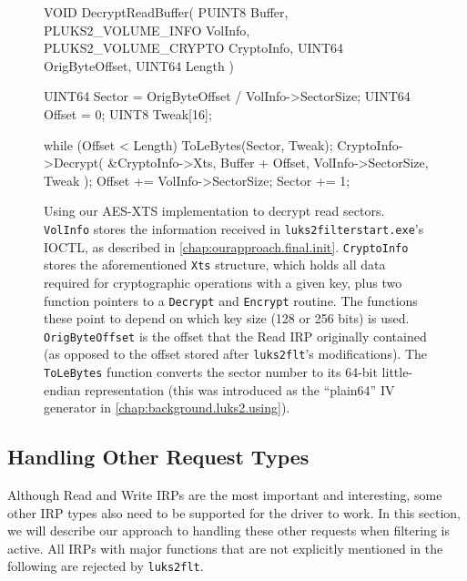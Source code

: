 \begin{figure}
	\begin{ccode}
VOID
DecryptReadBuffer(
    PUINT8 Buffer,
    PLUKS2_VOLUME_INFO VolInfo,
    PLUKS2_VOLUME_CRYPTO CryptoInfo,
    UINT64 OrigByteOffset,
    UINT64 Length
) {
    UINT64 Sector = OrigByteOffset / VolInfo->SectorSize;
    UINT64 Offset = 0;
    UINT8 Tweak[16];

    while (Offset < Length) {
        ToLeBytes(Sector, Tweak);
        CryptoInfo->Decrypt(
            &CryptoInfo->Xts, Buffer + Offset,
            VolInfo->SectorSize, Tweak
        );
        Offset += VolInfo->SectorSize;
        Sector += 1;
    }
}
	\end{ccode}
	\caption[
		Using our AES-XTS implementation to decrypt read sectors
	]{
		Using our AES-XTS implementation to decrypt read sectors. \texttt{VolInfo} stores the information received in \texttt{luks2filterstart.exe}'s IOCTL, as described in \autoref{chap:ourapproach.final.init}. \texttt{CryptoInfo} stores the aforementioned \texttt{Xts} structure, which holds all data required for cryptographic operations with a given key, plus two function pointers to a \texttt{Decrypt} and \texttt{Encrypt} routine. The functions these point to depend on which key size (128 or 256 bits) is used. \texttt{OrigByteOffset} is the offset that the Read IRP originally contained (as opposed to the offset stored after \texttt{luks2flt}'s modifications). The \texttt{ToLeBytes} function converts the sector number to its 64-bit little-endian representation (this was introduced as the ``plain64'' IV generator in \autoref{chap:background.luks2.using}).
	}
	\label{fig:ourapproach.final.decryptread}
\end{figure}

\subsection{Handling Other Request Types}
\label{chap:ourapproach.final.otherrequests}
Although Read and Write IRPs are the most important and interesting, some other IRP types also need to be supported for the driver to work. In this section, we will describe our approach to handling these other requests when filtering is active. All IRPs with major functions that are not explicitly mentioned in the following are rejected by \texttt{luks2flt}.

